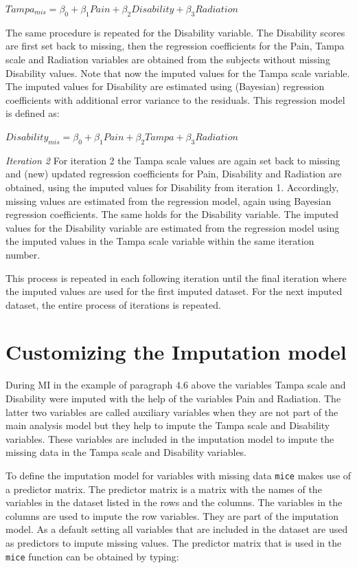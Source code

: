 \documentclass[
]{book}
\begin{document}
\(Tampa_{mis} = \beta_0 + \beta_1Pain + \beta_2Disability + \beta_3Radiation\)

The same procedure is repeated for the Disability variable. The Disability scores are first set back to missing, then the regression coefficients for the Pain, Tampa scale and Radiation variables are obtained from the subjects without missing Disability values. Note that now the imputed values for the Tampa scale variable. The imputed values for Disability are estimated using (Bayesian) regression coefficients with additional error variance to the residuals. This regression model is defined as:

\(Disability_{mis} = \beta_0 + \beta_1Pain + \beta_2Tampa + \beta_3Radiation\)

\emph{Iteration 2}
For iteration 2 the Tampa scale values are again set back to missing and (new) updated regression coefficients for Pain, Disability and Radiation are obtained, using the imputed values for Disability from iteration 1. Accordingly, missing values are estimated from the regression model, again using Bayesian regression coefficients. The same holds for the Disability variable. The imputed values for the Disability variable are estimated from the regression model using the imputed values in the Tampa scale variable within the same iteration number.

This process is repeated in each following iteration until the final iteration where the imputed values are used for the first imputed dataset. For the next imputed dataset, the entire process of iterations is repeated.

\hypertarget{customizing-the-imputation-model-1}{%
\section{Customizing the Imputation model}\label{customizing-the-imputation-model-1}}

During MI in the example of paragraph 4.6 above the variables Tampa scale and Disability were imputed with the help of the variables Pain and Radiation. The latter two variables are called auxiliary variables when they are not part of the main analysis model but they help to impute the Tampa scale and Disability variables. These variables are included in the imputation model to impute the missing data in the Tampa scale and Disability variables.

To define the imputation model for variables with missing data \texttt{mice} makes use of a predictor matrix. The predictor matrix is a matrix with the names of the variables in the dataset listed in the rows and the columns. The variables in the columns are used to impute the row variables. They are part of the imputation model. As a default setting all variables that are included in the dataset are used as predictors to impute missing values. The predictor matrix that is used in the \texttt{mice} function can be obtained by typing:
\end{document}
